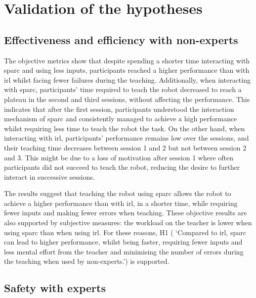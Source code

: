 
\section{Validation of the hypotheses}

\subsection{Effectiveness and efficiency with non-experts}
The objective metrics show that despite spending a shorter time interacting with \gls{sparc} and using less inputs, participants reached a higher performance than with \gls{irl} whilst facing fewer failures during the teaching. Additionally, when interacting with \gls{sparc}, participants' time required to teach the robot decreased to reach a plateau in the second and third sessions, without affecting the performance. This indicates that after the first session, participants understood the interaction mechanism of \gls{sparc} and consistently managed to achieve a high performance whilst requiring less time to teach the robot the task. On the other hand, when interacting with \gls{irl}, participants' performance remains low over the sessions, and their teaching time decreases between session 1 and 2 but not between session 2 and 3. This might be due to a loss of motivation after session 1 where often participants did not succeed to teach the robot, reducing the desire to further interact in successive sessions. 

The results suggest that teaching the robot using \gls{sparc} allows the robot to achieve a higher performance than with \gls{irl}, in a shorter time, while requiring fewer inputs and making fewer errors when teaching. These objective results are also supported by subjective measures: the workload on the teacher is lower when using \gls{sparc} than when using \gls{irl}. For these reasons, H1 ( `Compared to \gls{irl}, \gls{sparc} can lead to higher performance, whilst being faster, requiring fewer inputs and less mental effort from the teacher and minimising the number of errors during the teaching when used by non-experts.') is supported.

\subsection{Safety with experts}

